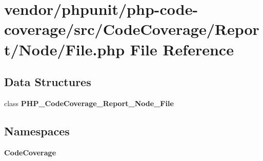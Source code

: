 \section{vendor/phpunit/php-\/code-\/coverage/src/\+Code\+Coverage/\+Report/\+Node/\+File.php File Reference}
\label{phpunit_2php-code-coverage_2src_2_code_coverage_2_report_2_node_2_file_8php}
\subsection*{Data Structures}
\begin{DoxyCompactItemize}
\item 
class {\bf P\+H\+P\+\_\+\+Code\+Coverage\+\_\+\+Report\+\_\+\+Node\+\_\+\+File}
\end{DoxyCompactItemize}
\subsection*{Namespaces}
\begin{DoxyCompactItemize}
\item 
 {\bf Code\+Coverage}
\end{DoxyCompactItemize}
